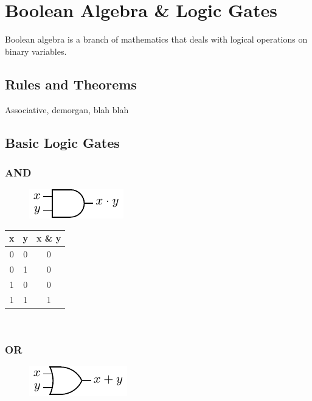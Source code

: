 \chapter{Boolean Algebra \& Logic Gates}

Boolean algebra is a branch of mathematics that deals with logical operations on binary variables.

\section{Rules and Theorems}

Associative, demorgan, blah blah

\section{Basic Logic Gates}

\subsection{AND}

\begin{figure}[h!]
	\includegraphics{./img/and.png}
\end{figure}

\begin{tabular}{c c c}
	\hline
	\textbf{x} & \textbf{y} & \textbf{x \& y} \\ 
	\hline
	0 & 0 & 0 \\
	0 & 1 & 0 \\
	1 & 0 & 0 \\
	1 & 1 & 1 \\
	\hline 
\end{tabular} \\

\subsection{OR}

\begin{figure}[h!]
	\includegraphics{./img/or.png}
\end{figure}


